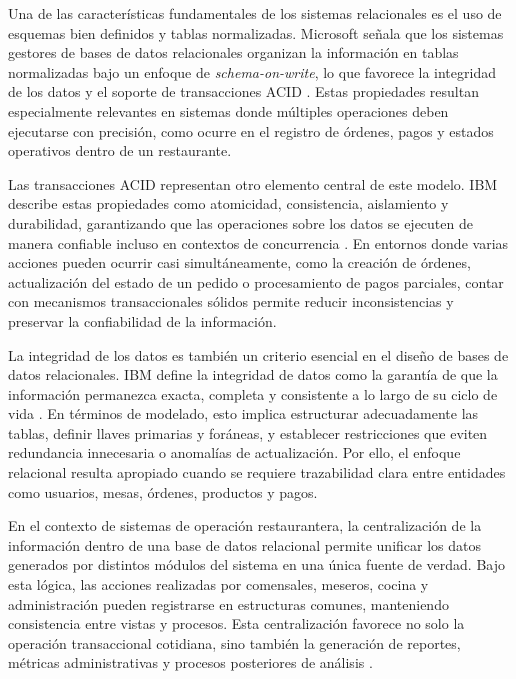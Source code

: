 \documentclass[12pt]{report}
\begin{document}
Una de las características fundamentales de los sistemas relacionales es el uso de esquemas bien definidos y tablas normalizadas. Microsoft señala que los sistemas gestores de bases de datos relacionales organizan la información en tablas normalizadas bajo un enfoque de \textit{schema-on-write}, lo que favorece la integridad de los datos y el soporte de transacciones ACID \cite{microsoft_data_models_2025}. Estas propiedades resultan especialmente relevantes en sistemas donde múltiples operaciones deben ejecutarse con precisión, como ocurre en el registro de órdenes, pagos y estados operativos dentro de un restaurante.

Las transacciones ACID representan otro elemento central de este modelo. IBM describe estas propiedades como atomicidad, consistencia, aislamiento y durabilidad, garantizando que las operaciones sobre los datos se ejecuten de manera confiable incluso en contextos de concurrencia \cite{ibm_relational_database_2025}. En entornos donde varias acciones pueden ocurrir casi simultáneamente, como la creación de órdenes, actualización del estado de un pedido o procesamiento de pagos parciales, contar con mecanismos transaccionales sólidos permite reducir inconsistencias y preservar la confiabilidad de la información.

La integridad de los datos es también un criterio esencial en el diseño de bases de datos relacionales. IBM define la integridad de datos como la garantía de que la información permanezca exacta, completa y consistente a lo largo de su ciclo de vida \cite{ibm_data_integrity_2025}. En términos de modelado, esto implica estructurar adecuadamente las tablas, definir llaves primarias y foráneas, y establecer restricciones que eviten redundancia innecesaria o anomalías de actualización. Por ello, el enfoque relacional resulta apropiado cuando se requiere trazabilidad clara entre entidades como usuarios, mesas, órdenes, productos y pagos.

En el contexto de sistemas de operación restaurantera, la centralización de la información dentro de una base de datos relacional permite unificar los datos generados por distintos módulos del sistema en una única fuente de verdad. Bajo esta lógica, las acciones realizadas por comensales, meseros, cocina y administración pueden registrarse en estructuras comunes, manteniendo consistencia entre vistas y procesos. Esta centralización favorece no solo la operación transaccional cotidiana, sino también la generación de reportes, métricas administrativas y procesos posteriores de análisis \cite{microsoft_oltp_2026,ibm_data_consistency_2025}.
\end{document}
